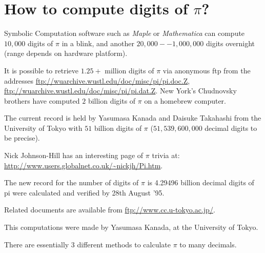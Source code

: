 \section{How to compute digits of $\pi$?}

Symbolic Computation software such as {\it Maple} or {\it Mathematica}
can compute $10,000$ digits of $\pi$ in a blink, and another
$20,000--1,000,000$ digits overnight (range depends on hardware
platform).

It is possible to retrieve $1.25+$ million digits of $\pi$ via anonymous
ftp from the addresses
\url{ftp://wuarchive.wustl.edu/doc/misc/pi/pi.doc.Z},
\url{ftp://wuarchive.wustl.edu/doc/misc/pi/pi.dat.Z}.  New York's
Chudnovsky brothers have computed $2$ billion digits of $\pi$ on a
homebrew computer.

The current record is held by Yasumasa Kanada and Daisuke Takahashi from
the University of Tokyo with $51$ billion digits of $\pi$
($51,539,600,000$ decimal digits to be precise).

Nick Johnson-Hill has an interesting page of $\pi$ trivia at:
\url{http://www.users.globalnet.co.uk/~nickjh/Pi.htm}.

%
%
%
%


%
The new record for the number of digits of $\pi$ is 4.29496 billion
decimal digits of pi were calculated and verified by 28th August '95.

Related documents are available from \url{ftp://www.cc.u-tokyo.ac.jp/}.

This computations were made by Yasumasa Kanada, at the University of
Tokyo.



There are essentially 3 different methods to calculate $\pi$ to many
decimals.

